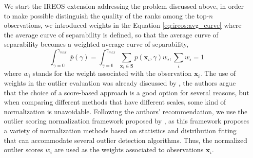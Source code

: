 We start the IREOS extension addressing the problem discussed above, in order to make possible distinguish the quality of the ranks among the top-$n$ observations, we introduced weights in the Equation \ref{eq:ireos:avg_curve} where the average curve of separability is defined, so that the average curve of separability becomes a weighted average curve of separability,
\begin{equation}
\int_{\gamma = 0}^{\gamma_{max}} \bar{p}(\gamma) = \int_{\gamma = 0}^{\gamma_{max}} \sum_{\mathbf{x}_i \in \mathbf{S}} p(\mathbf{x}_i, \gamma) w_i, \sum_i w_i = 1
\label{eq:w_avg_sep}
\end{equation}
where $w_i$ stands for the weight associated with the observation $\mathbf{x}_i$. The use of weights in the outlier evaluation was already discussed by \cite{schubert2012}, the authors argue that the choice of a score-based approach is a good option for several reasons, but when comparing different methods that have different scales, some kind of normalization is unavoidable. Following the authors' recommendation, we use the outlier scoring normalization framework proposed by \cite{kriegel2011}, as this framework proposes a variety of normalization methods based on statistics and distribution fitting that can accommodate several outlier detection algorithms. Thus, the normalized outlier scores $w_i$ are used as the weights associated to observations $\mathbf{x}_i$.

